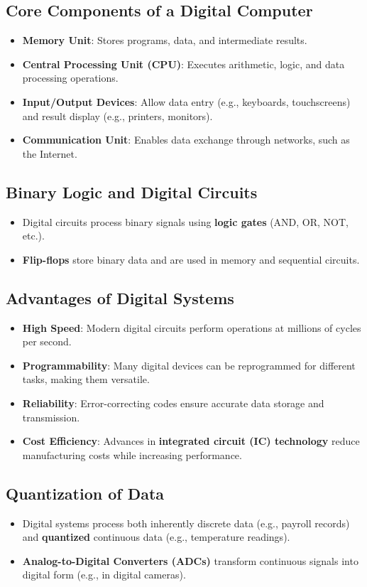 \documentclass[a4paper,12pt]{article}
\begin{document}
\subsection{Core Components of a Digital Computer}
\begin{itemize}
    \item \textbf{Memory Unit}: Stores programs, data, and intermediate results.
    \item \textbf{Central Processing Unit (CPU)}: Executes arithmetic, logic, and data processing operations.
    \item \textbf{Input/Output Devices}: Allow data entry (e.g., keyboards, touchscreens) and result display (e.g., printers, monitors).
    \item \textbf{Communication Unit}: Enables data exchange through networks, such as the Internet.
\end{itemize}

\subsection{Binary Logic and Digital Circuits}
\begin{itemize}
    \item Digital circuits process binary signals using \textbf{logic gates} (AND, OR, NOT, etc.).
    \item \textbf{Flip-flops} store binary data and are used in memory and sequential circuits.
\end{itemize}

\subsection{Advantages of Digital Systems}
\begin{itemize}
    \item \textbf{High Speed}: Modern digital circuits perform operations at millions of cycles per second.
    \item \textbf{Programmability}: Many digital devices can be reprogrammed for different tasks, making them versatile.
    \item \textbf{Reliability}: Error-correcting codes ensure accurate data storage and transmission.
    \item \textbf{Cost Efficiency}: Advances in \textbf{integrated circuit (IC) technology} reduce manufacturing costs while increasing performance.
\end{itemize}

\subsection{Quantization of Data}
\begin{itemize}
    \item Digital systems process both inherently discrete data (e.g., payroll records) and \textbf{quantized} continuous data (e.g., temperature readings).
    \item \textbf{Analog-to-Digital Converters (ADCs)} transform continuous signals into digital form (e.g., in digital cameras).
\end{itemize}
\end{document}
